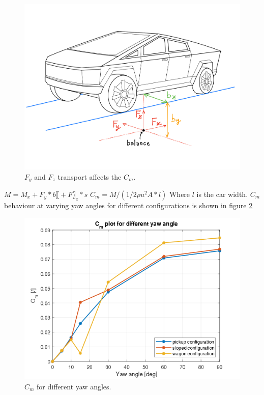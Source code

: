 \documentclass{elbioimp2}
\begin{document}
\begin{figure}[htp]
        \centering
        \includegraphics[width=1\columnwidth]{bracci.png}
        \caption{$F_y$ and $F_z$ transport affects the $C_m$.\label{bracci}}
    \end{figure}
$M=M_x+F_y*b〖+F〗_z*s$
$C_m=M/(1/2 ρu^2 A*l)$
Where $l$ is the car width. $C_m$ behaviour at varying yaw angles for different configurations is shown in figure \ref{cm}
\begin{figure}[htp]
        \centering
        \includegraphics[width=1\columnwidth]{cm.png}
        \caption{$C_m$ for different yaw angles.\label{cm}}
    \end{figure}
\end{document}
